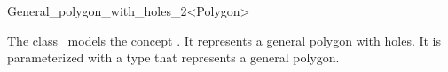 \ccRefPageBegin

\begin{ccRefClass}{General_polygon_with_holes_2<Polygon>}

\ccThreeToTwo

\ccDefinition
The class \ccRefName\ models the concept .
It represents a general polygon with holes. It is parameterized with a
type  that represents a general polygon.

 
\ccIsModel

\end{ccRefClass}
\ccRefPageEnd

